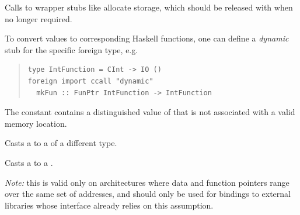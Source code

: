 \begin{haddockdesc}
{\begin{quote}
\end{quote}
Calls to wrapper stubs like  allocate storage, which
 should be released with  when no
 longer required.\par
To convert  values to corresponding Haskell functions, one
 can define a \emph{dynamic} stub for the specific foreign type, e.g.\par
\begin{quote}
{\haddockverb\begin{verbatim}
type IntFunction = CInt -> IO ()
foreign import ccall "dynamic"
  mkFun :: FunPtr IntFunction -> IntFunction\end{verbatim}}
\end{quote}}
\end{haddockdesc}
\begin{haddockdesc}
\item[\begin{tabular}{@{}l}
instance Storable FunPtr a\\instance Show FunPtr a\\instance Eq FunPtr a\\instance Ord FunPtr a\\\end{tabular}]
\end{haddockdesc}
\begin{haddockdesc}
\item[\begin{tabular}{@{}l}
nullFunPtr :: FunPtr a
\end{tabular}]
{\haddockbegindoc
The constant  contains a
 distinguished value of  that is not
 associated with a valid memory location.\par}
\end{haddockdesc}
\begin{haddockdesc}
\item[\begin{tabular}{@{}l}
castFunPtr :: FunPtr a -> FunPtr b
\end{tabular}]
{\haddockbegindoc
Casts a  to a  of a different type.\par}
\end{haddockdesc}
\begin{haddockdesc}
\item[\begin{tabular}{@{}l}
castFunPtrToPtr :: FunPtr a -> Ptr b
\end{tabular}]
{\haddockbegindoc
Casts a  to a .\par
\emph{Note:} this is valid only on architectures where data and function
 pointers range over the same set of addresses, and should only be used
 for bindings to external libraries whose interface already relies on
 this assumption.\par}
\end{haddockdesc}
